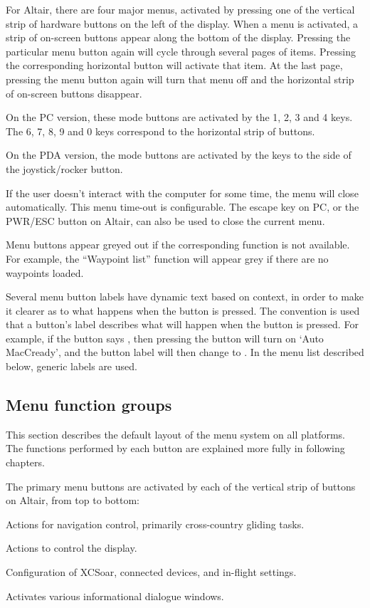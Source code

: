 For Altair, there are four major menus, activated by pressing one of
the vertical strip of hardware buttons on the left of the display.
When a menu is activated, a strip of on-screen buttons appear along the 
bottom of the display.  Pressing the particular menu button again will
cycle through several pages of items.  Pressing the corresponding
horizontal button will activate that item.  At the last page, pressing
the menu button again will turn that menu off and the horizontal strip
of on-screen buttons disappear.  

On the PC version, these mode buttons are activated by the
1, 2, 3 and 4 keys.  The 6, 7, 8, 9 and 0 keys correspond to the horizontal
strip of buttons.

On the PDA version, the mode buttons are activated by the keys to the
side of the joystick/rocker button.

If the user doesn't interact with the computer for some time, the
menu will close automatically.  This menu time-out is configurable.
The escape key on PC, or the PWR/ESC button on Altair, can
also be used to close the current menu.

Menu buttons appear greyed out if the corresponding function is not available. 
For example, the ``Waypoint list'' function will appear grey if there are no waypoints loaded.

Several menu button labels have dynamic text based on context, in
order to make it clearer as to what happens when the button is
pressed.  The convention is used that a button's label describes what
will happen when the button is pressed.  For example, if the button
says , then pressing the button will turn on `Auto
MacCready', and the button label will then change to . 
In the menu list described below, generic labels are used.

\subsection*{Menu function groups}
This section describes the default layout of the menu system on all
platforms.  The functions performed by each button are explained more
fully in following chapters.

The primary menu buttons are activated by each of the vertical strip of buttons
on Altair, from top to bottom:
\begin{jspecs}
\item[\bmenug{Nav}] Actions for navigation control, primarily cross-country
gliding tasks.
\item[\bmenug{Display}] Actions to control the display.
\item[\bmenug{Config}] Configuration of XCSoar, connected devices, and in-flight
settings.
\item[\bmenug{Info}] Activates various informational dialogue windows.
\end{jspecs}

